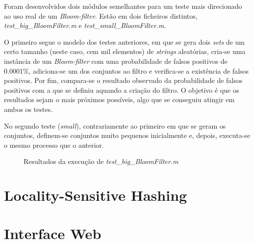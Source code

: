 \documentclass[a4paper,11pt,openright,oneside]{report}
\begin{document}
Foram desenvolvidos dois módulos semelhantes para um teste mais direcionado ao uso real de um \textit{Bloom-filter}. Estão em dois ficheiros distintos, \textit{test\_big\_BloomFilter.m} e \textit{test\_small\_BloomFilter.m}.

O primeiro segue o modelo dos testes anteriores, em que se gera dois \textit{sets} de um certo tamanho (neste caso, cem mil elementos) de \textit{strings} aleatórias, cria-se uma instância de um \textit{Bloom-filter} com uma probabilidade de falsos positivos de 0.0001\%, adiciona-se um dos conjuntos ao filtro e verifica-se a existência de falsos positivos. Por fim, compara-se o resultado observado da probabilidade de falsos positivos com a que se definiu aquando a criação do filtro. O objetivo é que os resultados sejam o mais próximos possíveis, algo que se conseguiu atingir em ambos os testes.

No segundo teste (\textit{small}), contrariamente ao primeiro em que se geram os conjuntos, definem-se conjuntos muito pequenos inicialmente e, depois, executa-se o mesmo processo que o anterior.

\begin{figure}[ht]	
\center
{}
\caption{Resultados da execução de \textit{test\_big\_BloomFilter.m}}
\label{fig:testbigbloom}
\end{figure}


\section{Locality-Sensitive Hashing}
\label{sec.lsh}






\iffalse





\section{Interface Web}
\label{sec.web}
\end{document}
